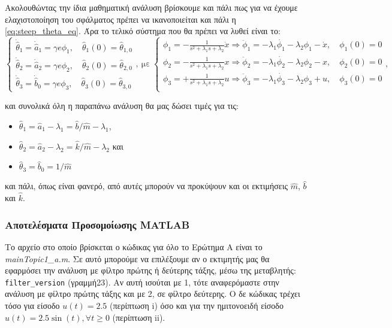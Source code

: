 \documentclass[12pt]{article} %
\numberwithin{equation}{section}  %
\begin{document}
Ακολουθώντας την ίδια μαθηματική ανάλυση βρίσκουμε και πάλι πως για να έχουμε ελαχιστοποίηση του σφάλματος πρέπει να ικανοποιείται και πάλι η \eqref{eq:steep_theta_eq}. Άρα το τελικό σύστημα που θα πρέπει να λυθεί είναι το:
\vspace{-\topsep}
\vspace{+3pt}
\[
\begin{cases} 
\dot{\hat{\theta}}_1 = \dot{\hat{a}}_1 = \gamma e\phi_1, \quad \hat{\theta}_1(0) = \hat{\theta}_{1, 0} \\ 
\dot{\hat{\theta}}_2 = \dot{\hat{a}}_2 = \gamma e\phi_2, \quad \hat{\theta}_2(0) = \hat{\theta}_{2, 0} \\
\dot{\hat{\theta}}_3 = \dot{\hat{b}}_0 = \gamma e\phi_3, \quad \hat{\theta}_3(0) = \hat{\theta}_{3, 0} 
\end{cases}, 
\ \text{με} \  
\begin{cases} 
\phi_1 = -\frac{1}{s^2 + \lambda_1 s + \lambda_2}\dot{x} \Rightarrow \ddot{\phi}_1 = -\lambda_1 \dot{\phi_1} -\lambda_2 \phi_1 - \dot{x}, \quad \phi_1(0) = 0 \\ 
\phi_2 = -\frac{1}{s^2 + \lambda_1 s + \lambda_2}x \Rightarrow \ddot{\phi}_2 = -\lambda_1 \dot{\phi_2} -\lambda_2 \phi_2 - x, \quad \phi_2(0) = 0 \\ 
\phi_3 = +\frac{1}{s^2 + \lambda_1 s + \lambda_2}u \Rightarrow \ddot{\phi}_3 = -\lambda_1 \dot{\phi_3} -\lambda_2 \phi_3 + u, \quad \phi_3(0) = 0 \\ 
\end{cases},
\]

\noindent και συνολικά όλη η παραπάνω ανάλυση θα μας δώσει τιμές για τις:
\begin{itemize}[noitemsep, nolistsep]
    \item $\hat{\theta}_1 = \hat{a}_1 - \lambda_1 = \hat{b} / \hat{m} - \lambda_1$,
    \item $\hat{\theta}_2 = \hat{a}_2 - \lambda_2 = \hat{k} / \hat{m} - \lambda_2$ και
    \item $\hat{\theta}_3 = \hat{b}_0 = 1 / \hat{m}$
\end{itemize}
και πάλι, όπως είναι φανερό, από αυτές μπορούν να προκύψουν και οι εκτιμήσεις $\hat{m}$, $\hat{b}$ και $\hat{k}$.  



\subsubsection{Αποτελέσματα Προσομοίωσης MATLAB}

Το αρχείο στο οποίο βρίσκεται ο κώδικας για όλο το Ερώτημα Α είναι το \textit{mainTopic1\_a.m}. 
Σε αυτό μπορούμε να επιλέξουμε αν ο εκτιμητής μας θα εφαρμόσει την ανάλυση με φίλτρο πρώτης ή δεύτερης τάξης, μέσω της μεταβλητής: \texttt{filter\_version} (γραμμή23). 
Αν αυτή ισούται με 1, τότε αναφερόμαστε στην ανάλυση με φίλτρο πρώτης τάξης και με 2, σε φίλτρο δεύτερης.
Ο δε κώδικας τρέχει τόσο για είσοδο $u(t) = 2.5$ (περίπτωση i) όσο και για την ημιτονοειδή είσοδο $u(t) = 2.5 \sin(t), \forall t \ge 0$ (περίπτωση ii).
\end{document}
